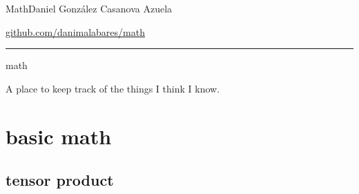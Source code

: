 
%



\begin{minipage}{\textwidth}
	\begin{minipage}{1\textwidth}
		Math\hfill Daniel González Casanova Azuela
		
		{\small \hfill\href{https://github.com/danimalabares/math}{github.com/danimalabares/math}}
	\end{minipage}
\end{minipage}\vspace{.2cm}\hrule
{\huge math}
\vspace{10pt}

A place to keep track of the things I think I know.

\tableofcontents
\clearpage
\section{basic math}

\subsection{tensor product}

